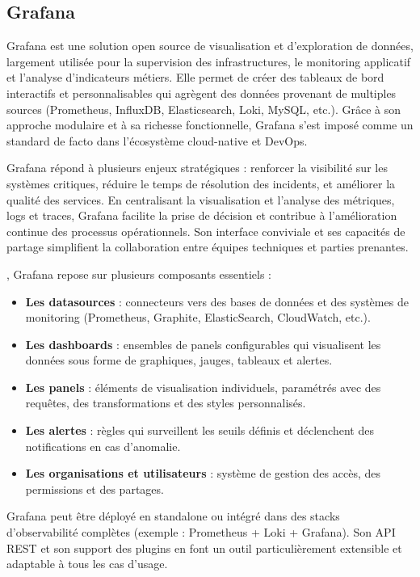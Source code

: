 \subsection{Grafana}

Grafana est une solution open source de visualisation et d’exploration de données, largement utilisée pour la supervision des infrastructures, le monitoring applicatif et l’analyse d’indicateurs métiers. Elle permet de créer des tableaux de bord interactifs et personnalisables qui agrègent des données provenant de multiples sources (Prometheus, InfluxDB, Elasticsearch, Loki, MySQL, etc.). Grâce à son approche modulaire et à sa richesse fonctionnelle, Grafana s’est imposé comme un standard de facto dans l’écosystème cloud-native et DevOps.

Grafana répond à plusieurs enjeux stratégiques  : renforcer la visibilité sur les systèmes critiques, réduire le temps de résolution des incidents, et améliorer la qualité des services. En centralisant la visualisation et l’analyse des métriques, logs et traces, Grafana facilite la prise de décision et contribue à l’amélioration continue des processus opérationnels. Son interface conviviale et ses capacités de partage simplifient la collaboration entre équipes techniques et parties prenantes.

, Grafana repose sur plusieurs composants essentiels  :
\begin{itemize}
	\item \textbf{Les datasources}  : connecteurs vers des bases de données et des systèmes de monitoring (Prometheus, Graphite, ElasticSearch, CloudWatch, etc.).
	\item \textbf{Les dashboards}  : ensembles de panels configurables qui visualisent les données sous forme de graphiques, jauges, tableaux et alertes.
	\item \textbf{Les panels}  : éléments de visualisation individuels, paramétrés avec des requêtes, des transformations et des styles personnalisés.
	\item \textbf{Les alertes}  : règles qui surveillent les seuils définis et déclenchent des notifications en cas d’anomalie.
	\item \textbf{Les organisations et utilisateurs}  : système de gestion des accès, des permissions et des partages.
\end{itemize}

Grafana peut être déployé en standalone ou intégré dans des stacks d’observabilité complètes (exemple  : Prometheus + Loki + Grafana). Son API REST et son support des plugins en font un outil particulièrement extensible et adaptable à tous les cas d’usage.

